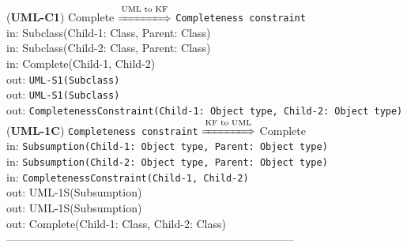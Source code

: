 \documentclass[sn-mathphys]{sn-jnl}
\begin{document}
{{({\bf UML-C1}) {Complete} $\overset{\text{UML to KF}}{\xLongrightarrow{\hspace*{1.4cm}}}$ {\tt Completeness constraint}\\
\hspace*{0.3cm}in: {Subclass(Child-1: Class, Parent: Class)} \\
\hspace*{0.3cm}in: {Subclass(Child-2: Class, Parent: Class)} \\
\hspace*{0.3cm}in: {Complete(Child-1, Child-2)} \\
\hspace*{0.5cm}out:  {\tt UML-S1(Subclass)}\\
\hspace*{0.5cm}out:  {\tt UML-S1(Subclass)}\\
\hspace*{0.5cm}out:  {\tt CompletenessConstraint(Child-1: Object type, Child-2: Object type)}\\

({\bf UML-1C}) {\tt Completeness constraint} $\overset{\text{KF to UML}}{\xLongrightarrow{\hspace*{1.4cm}}}$ {Complete}\\
\hspace*{0.3cm}in: {\tt Subsumption(Child-1: Object type, Parent: Object type)} \\
\hspace*{0.3cm}in: {\tt Subsumption(Child-2: Object type, Parent: Object type)} \\
\hspace*{0.3cm}in: {\tt CompletenessConstraint(Child-1, Child-2)} \\
\hspace*{0.5cm}out:  {UML-1S(Subsumption)}\\
\hspace*{0.5cm}out:  {UML-1S(Subsumption)}\\
\hspace*{0.5cm}out:  {Complete(Child-1: Class, Child-2: Class)}\\

------------------------------------------------------------------------------
\\ \

}}
\end{document}
